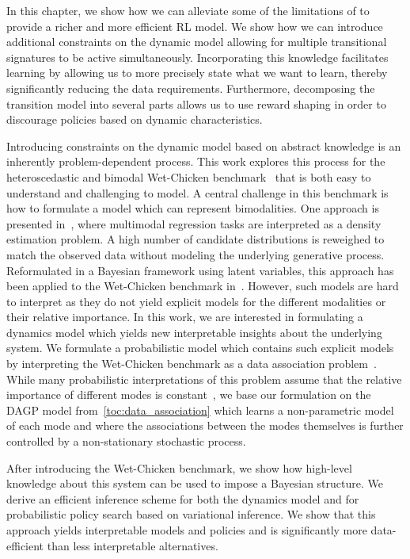In this chapter, we show how we can alleviate some of the limitations of \parencite{deisenroth_pilco_2011} to provide a richer and more efficient RL model.
We show how we can introduce additional constraints on the dynamic model allowing for multiple transitional signatures to be active simultaneously.
Incorporating this knowledge facilitates learning by allowing us to more precisely state what we want to learn, thereby significantly reducing the data requirements.
Furthermore, decomposing the transition model into several parts allows us to use reward shaping \parencite{sutton_reinforcement_2018} in order to discourage policies based on dynamic characteristics.

Introducing constraints on the dynamic model based on abstract knowledge is an inherently problem-dependent process.
This work explores this process for the heteroscedastic and bimodal Wet-Chicken benchmark~\parencite{tresp_wet_1994,hans_efficient_2009} that is both easy to understand and challenging to model.
A central challenge in this benchmark is how to formulate a model which can represent bimodalities.
One approach is presented in~\parencite{bishop_mixture_1994}, where multimodal regression tasks are interpreted as a density estimation problem.
A high number of candidate distributions is reweighed to match the observed data without modeling the underlying generative process.
Reformulated in a Bayesian framework using latent variables, this approach has been applied to the Wet-Chicken benchmark in~\parencite{depeweg_learning_2016,depeweg_decomposition_2018}.
However, such models are hard to interpret as they do not yield explicit models for the different modalities or their relative importance.
In this work, we are interested in formulating a dynamics model which yields new interpretable insights about the underlying system.
We formulate a probabilistic model which contains such explicit models by interpreting the Wet-Chicken benchmark as a data association problem~\parencite{barshalom_tracking_1990,cox_review_1993}.
While many probabilistic interpretations of this problem assume that the relative importance of different modes is constant~\parencite{lazaro-gredilla_overlapping_2012,bodin_latent_2017}, we base our formulation on the DAGP model from~\cref{toc:data_association} which learns a non-parametric model of each mode and where the associations between the modes themselves is further controlled by a non-stationary stochastic process.

After introducing the Wet-Chicken benchmark, we show how high-level knowledge about this system can be used to impose a Bayesian structure.
We derive an efficient inference scheme for both the dynamics model and for probabilistic policy search based on variational inference.
We show that this approach yields interpretable models and policies and is significantly more data-efficient than less interpretable alternatives.


